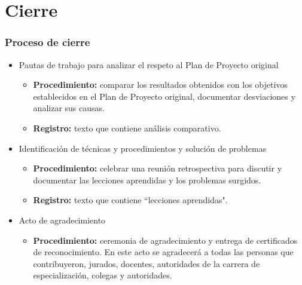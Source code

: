 \documentclass[aspectratio=169]{beamer}
\begin{document}
\section{Cierre}

\begin{frame}
	\frametitle{Proceso de cierre}

\begin{itemize}
		\item Pautas de trabajo para analizar el respeto al Plan de Proyecto original
		\begin{itemize}

			\item \textbf{Procedimiento:} comparar los resultados obtenidos con los objetivos establecidos en el Plan de Proyecto original, documentar desviaciones y analizar sus causas.
			\item \textbf{Registro:} texto que contiene análisis comparativo.
		\end{itemize}
		
		\item Identificación de técnicas y procedimientos y solución de problemas
		\begin{itemize}
	
			\item \textbf{Procedimiento:} celebrar una reunión retrospectiva para discutir y documentar las lecciones aprendidas y los problemas surgidos.
			\item \textbf{Registro:} texto que contiene ``lecciones aprendidas".
		\end{itemize}
		
		\item Acto de agradecimiento
		\begin{itemize}
			
			\item \textbf{Procedimiento:} ceremonia de agradecimiento y entrega de certificados de reconocimiento. En este acto se agradecerá a todas las personas
			que contribuyeron, jurados, docentes, autoridades de la carrera de especialización,
			colegas y autoridades.
		\end{itemize}
		\end{itemize}

\end{frame}
\end{document}

